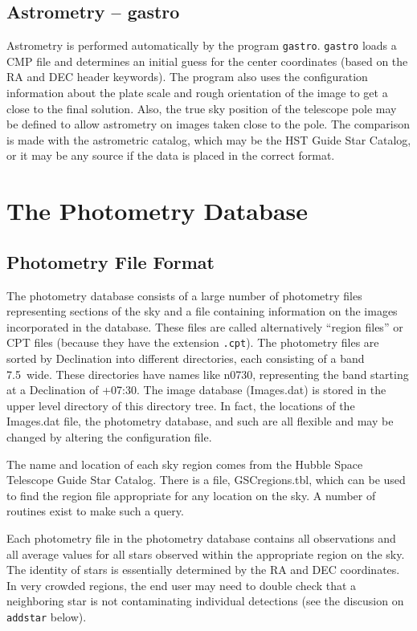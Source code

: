 \documentclass{article}
\begin{document}
\subsection{Astrometry -- gastro}

Astrometry is performed automatically by the program {\tt gastro}.
{\tt gastro} loads a CMP file and determines an initial guess for the
center coordinates (based on the RA and DEC header keywords).  The
program also uses the configuration information about the plate scale
and rough orientation of the image to get a close to the final
solution.  Also, the true sky position of the telescope pole may be
defined to allow astrometry on images taken close to the pole.  The
comparison is made with the astrometric catalog, which may be the HST
Guide Star Catalog, or it may be any source if the data is placed in
the correct format.

\section{The Photometry Database}

\subsection{Photometry File Format}
The photometry database consists of a large number of photometry files
representing sections of the sky and a file containing information on
the images incorporated in the database.  These files are called
alternatively ``region files'' or CPT files (because they have the
extension {\tt .cpt}).  The photometry files are sorted by Declination
into different directories, each consisting of a band 7.5\degree\ 
wide.  These directories have names like n0730, representing the band
starting at a Declination of +07:30.  The image database (Images.dat)
is stored in the upper level directory of this directory tree.  In
fact, the locations of the Images.dat file, the photometry database,
and such are all flexible and may be changed by altering the
configuration file.

The name and location of each sky region comes from the Hubble Space
Telescope Guide Star Catalog.  There is a file, GSCregions.tbl, which
can be used to find the region file appropriate for any location on
the sky.  A number of routines exist to make such a query.  

Each photometry file in the photometry database contains all
observations and all average values for all stars observed within the
appropriate region on the sky.  The identity of stars is essentially
determined by the RA and DEC coordinates.  In very crowded regions,
the end user may need to double check that a neighboring star is not
contaminating individual detections (see the discusion on {\tt
  addstar} below).
\end{document}
